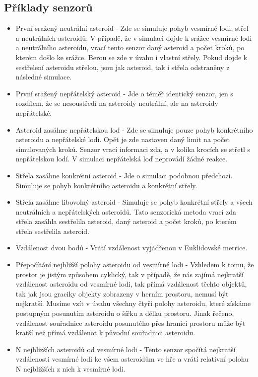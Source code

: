 \subsection{Příklady senzorů}
\begin{itemize}
    \item První sražený neutrální asteroid - Zde se simuluje pohyb vesmírné lodi, střel a neutrálních asteroidů. 
    V případě, že v simulaci dojde k srážce vesmírné lodi a neutrálního asteroidu, vrací tento senzor daný asteroid a počet kroků, po kterém došlo ke srážce.
    Berou se zde v úvahu i vlastní střely. Pokud dojde k sestřelení asteroidu střelou, jsou jak asteroid, tak i střela odstraněny z následné simulace.
    \item První sražený nepřátelský asteroid - Jde o téměř identický senzor, jen s rozdílem, že se nesoustředí na asteroidy neutrální, ale na asteroidy nepřátelské.
    \item Asteroid zasáhne nepřátelskou loď - Zde se simuluje pouze pohyb konkrétního asteroidu a nepřátelské lodí. 
    Opět je zde nastaven daný limit na počet simulovaných kroků. 
    Senzor vrací informaci zda, a v kolika krocích se střetl s nepřátelskou lodí.
    V simulaci nepřátelská loď neprovádí žádné reakce.
    \item Střela zasáhne konkrétní asteroid - Jde o simulaci podobnou předchozí. Simuluje se pohyb konkrétního asteroidu a konkrétní střely.
    \item Střela zasáhne libovolný asteroid - Simuluje se pohyb konkrétní střely a všech neutrálních a nepřátelských asteroidů.
        Tato senzorická metoda vrací zda střela zasáhla sestřelila asteroid, daný asteroid a počet kroků, po kterém střela sestřelila asteroid.
    \item Vzdálenost dvou bodů - Vrátí vzdálenost vyjádřenou v Euklidovské metrice.
    \item Přepočítání nejbližší polohy asteroidu od vesmírné lodi - Vzhledem k tomu, že prostor je jistým způsobem cyklický, tak v případě, že nás zajímá nejkratší vzdálenost asteroidu od vesmírné lodi, tak přímá vzdálenost těchto objektů, tak jak jsou graciky objekty zobrazeny v herním prostoru, nemusí být nejkratší.
        Musíme vzít v úvahu všechny čtyři polohy asteroidu, které získáme postupným posunutím asteroidu o šířku a délku prostoru.
        Jinak řečeno, vzdálenost souřadnice asteroidu posunutého přes hranici prostoru může být kratší než přímá vzdálenot k původní souřadnici asteroidu.
    \item N nejblizších asteroidů od vesmírné lodi - Tento senzor spočítá nejkratší vzdálenosti vesmírné lodi ke všem asteroidům ve hře a vrátí relativní polohu N nejbližších z nich k vesmírné lodi.
    
\end{itemize}


